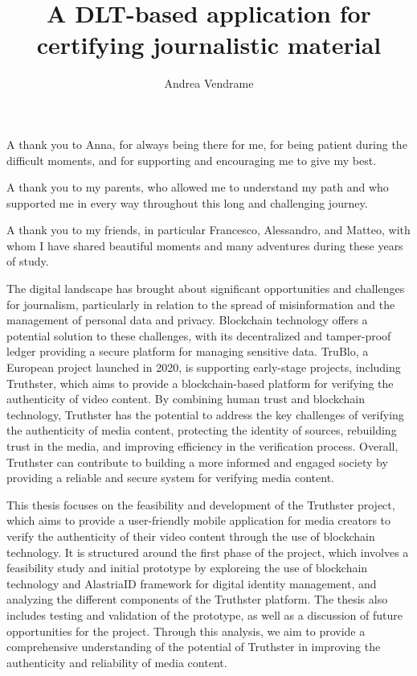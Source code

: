 \documentclass[target=mst,aauheader=]{thud}
\title{A DLT-based application for certifying journalistic material}
\author{Andrea Vendrame}
\begin{document}
\maketitle

\acknowledgements
A thank you to Anna, for always being there for me, for being patient during the difficult moments, and for supporting and encouraging me to give my best.\par

A thank you to my parents, who allowed me to understand my path and who supported me in every way throughout this long and challenging journey.\par

A thank you to my friends, in particular Francesco, Alessandro, and Matteo, with whom I have shared beautiful moments and many adventures during these years of study.

\abstract
The digital landscape has brought about significant opportunities and challenges for journalism, particularly in relation to the spread of misinformation and the management of personal data and privacy. Blockchain technology offers a potential solution to these challenges, with its decentralized and tamper-proof ledger providing a secure platform for managing sensitive data. TruBlo, a European project launched in 2020, is supporting early-stage projects, including Truthster, which aims to provide a blockchain-based platform for verifying the authenticity of video content. By combining human trust and blockchain technology, Truthster has the potential to address the key challenges of verifying the authenticity of media content, protecting the identity of sources, rebuilding trust in the media, and improving efficiency in the verification process. Overall, Truthster can contribute to building a more informed and engaged society by providing a reliable and secure system for verifying media content.\par
This thesis focuses on the feasibility and development of the Truthster project, which aims to provide a user-friendly mobile application for media creators to verify the authenticity of their video content through the use of blockchain technology. It is structured around the first phase of the project, which involves a feasibility study and initial prototype by exploreing the use of blockchain technology and AlastriaID framework for digital identity management, and analyzing the different components of the Truthster platform. The thesis also includes testing and validation of the prototype, as well as a discussion of future opportunities for the project. Through this analysis, we aim to provide a comprehensive understanding of the potential of Truthster in improving the authenticity and reliability of media content.
\end{document}

